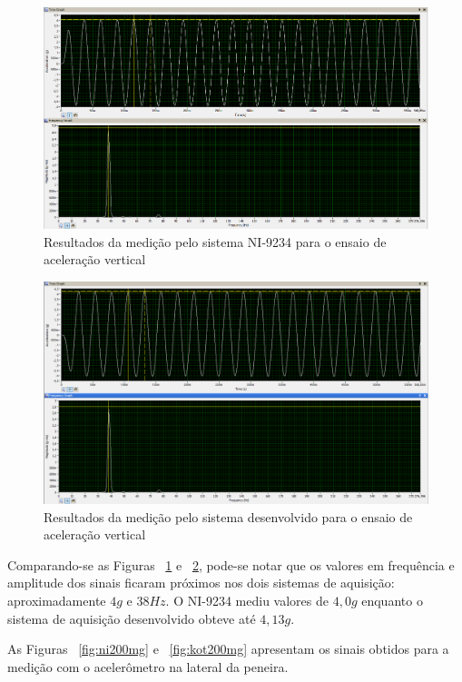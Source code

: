 \documentclass[
	12pt,				%
	openright,			%
	twoside,			%
	a4paper,			%
	english,			%
	french,				%
	spanish,			%
	brazil,				%
	]{abntex2}
\begin{document}
		\begin{figure}[!ht]
			\centering
			\includegraphics[width=\linewidth]{../Fotos/ni4g.png}
			\caption{Resultados da medição pelo sistema NI-9234 para o ensaio de aceleração vertical}
			\label{fig:ni4g}
		\end{figure}

		\begin{figure}[!ht]
			\centering
			\includegraphics[width=\linewidth]{../Fotos/kot4g.png}
			\caption{Resultados da medição pelo sistema desenvolvido para o ensaio de aceleração vertical}
			\label{fig:kot4g}
		\end{figure}

		Comparando-se as Figuras ~\ref{fig:ni4g} e ~\ref{fig:kot4g}, pode-se notar que os valores em frequência e amplitude dos sinais ficaram próximos nos dois sistemas de aquisição: aproximadamente $4g$ e $38Hz$. O NI-9234 mediu valores de $4,0g$ enquanto o sistema de aquisição desenvolvido obteve até $4,13g$.

		As Figuras ~\ref{fig:ni200mg} e ~\ref{fig:kot200mg} apresentam os sinais obtidos para a medição com o acelerômetro na lateral da peneira.
\end{document}
